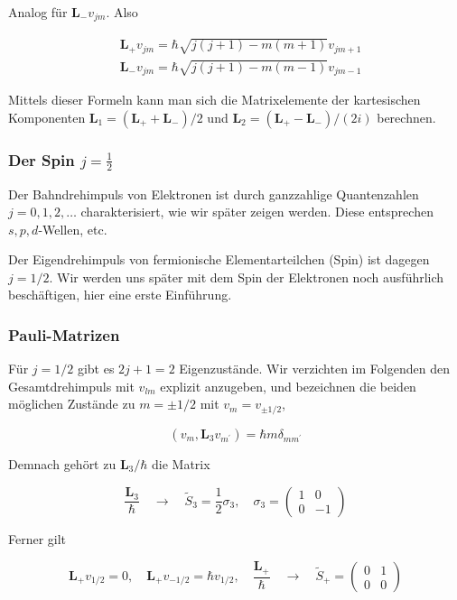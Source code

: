 \documentclass[10pt, letterpaper]{article}
\begin{document}
Analog für $\mathbf{L}_{-} v_{j m}$. Also

$$
\begin{aligned}
& \mathbf{L}_{+} v_{j m}=\hbar \sqrt{j(j+1)-m(m+1)} v_{j m+1} \\
& \mathbf{L}_{-} v_{j m}=\hbar \sqrt{j(j+1)-m(m-1)} v_{j m-1}
\end{aligned}
$$

Mittels dieser Formeln kann man sich die Matrixelemente der kartesischen Komponenten $\mathbf{L}_{1}=\left(\mathbf{L}_{+}+\mathbf{L}_{-}\right) / 2$ und $\mathbf{L}_{2}=\left(\mathbf{L}_{+}-\mathbf{L}_{-}\right) /(2 i)$ berechnen.

\subsubsection*{Der Spin $j=\frac{1}{2}$}
Der Bahndrehimpuls von Elektronen ist durch ganzzahlige Quantenzahlen $j=0,1,2, \ldots$ charakterisiert, wie wir später zeigen werden. Diese entsprechen $s, p, d$-Wellen, etc.

Der Eigendrehimpuls von fermionische Elementarteilchen (Spin) ist dagegen $j=1 / 2$. Wir werden uns später mit dem Spin der Elektronen noch ausführlich beschäftigen, hier eine erste Einführung.

\subsubsection*{Pauli-Matrizen}
Für $j=1 / 2$ gibt es $2 j+1=2$ Eigenzustände. Wir verzichten im Folgenden den Gesamtdrehimpuls mit $v_{l m}$ explizit anzugeben, und bezeichnen die beiden möglichen Zustände zu $m= \pm 1 / 2$ mit $v_{m}=v_{ \pm 1 / 2}$,

$$
\left(v_{m}, \mathbf{L}_{3} v_{m^{\prime}}\right)=\hbar m \delta_{m m^{\prime}}
$$

Demnach gehört zu $\mathbf{L}_{3} / \hbar$ die Matrix

$$
\frac{\mathbf{L}_{3}}{\hbar} \quad \rightarrow \quad \tilde{S}_{3}=\frac{1}{2} \sigma_{3}, \quad \sigma_{3}=\left(\begin{array}{cc}
1 & 0 \\
0 & -1
\end{array}\right)
$$

Ferner gilt

$$
\mathbf{L}_{+} v_{1 / 2}=0, \quad \mathbf{L}_{+} v_{-1 / 2}=\hbar v_{1 / 2}, \quad \frac{\mathbf{L}_{+}}{\hbar} \quad \rightarrow \quad \tilde{S}_{+}=\left(\begin{array}{cc}
0 & 1 \\
0 & 0
\end{array}\right)
$$
\end{document}
